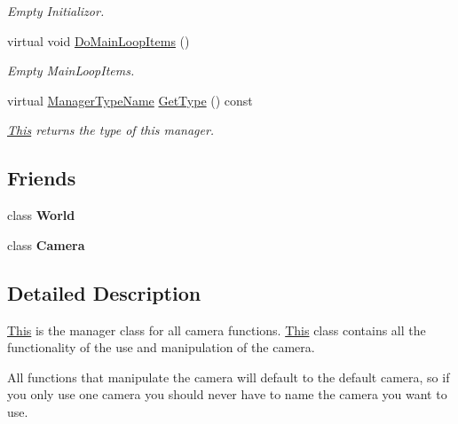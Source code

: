 \begin{DoxyCompactItemize}
\begin{DoxyCompactList}\small\item\em Empty Initializor. \item\end{DoxyCompactList}\item 
virtual void \hyperlink{classphys_1_1CameraManager_aaae22266bccc43f6efa66d2735d7d1d3}{DoMainLoopItems} ()
\begin{DoxyCompactList}\small\item\em Empty MainLoopItems. \item\end{DoxyCompactList}\item 
virtual \hyperlink{classphys_1_1ManagerBase_aaa6ccddf23892eaccb898529414f80a5}{ManagerTypeName} \hyperlink{classphys_1_1CameraManager_a8412ea634307aa280b615a3cc7c9b739}{GetType} () const 
\begin{DoxyCompactList}\small\item\em \hyperlink{structThis}{This} returns the type of this manager. \item\end{DoxyCompactList}\end{DoxyCompactItemize}
\subsection*{Friends}
\begin{DoxyCompactItemize}
\item 
\hypertarget{classphys_1_1CameraManager_a7b4bcdf992c21ae83363f25df05b1d25}{
class {\bfseries World}}
\label{d9/d91/classphys_1_1CameraManager_a7b4bcdf992c21ae83363f25df05b1d25}

\item 
\hypertarget{classphys_1_1CameraManager_ad8bd9afbbd7af19d996da80e9d25890d}{
class {\bfseries Camera}}
\label{d9/d91/classphys_1_1CameraManager_ad8bd9afbbd7af19d996da80e9d25890d}

\end{DoxyCompactItemize}


\subsection{Detailed Description}
\hyperlink{structThis}{This} is the manager class for all camera functions. \hyperlink{structThis}{This} class contains all the functionality of the use and manipulation of the camera. \par
 All functions that manipulate the camera will default to the default camera, so if you only use one camera you should never have to name the camera you want to use. 

